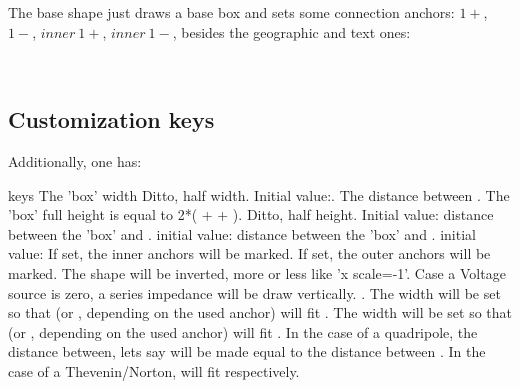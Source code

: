 \documentclass[a4paper, titlepage]{article}
\begin{document}
The base shape just draws a base box and sets some connection anchors: $1+$, $1-$, $inner\ 1+$, $inner\ 1-$, besides the geographic and text ones:

        
~   

\subsection{Customization keys}\label{BBkeys}

Additionally, one has:

\begin{describelist*}[30mm]{keys}
    {The 'box' width}
    {Ditto, half width. Initial value:.}
    {The distance between . The 'box' full height is equal to 2*( +  + ).}
   {Ditto, half height. Initial value: }
   {distance between the 'box' and . initial value: }
   {distance between the 'box' and . initial value: }
    {If set, the inner anchors will be marked.}
    {If set, the outer anchors will be marked.}
   {The shape will be inverted, more or less like 'x scale=-1'.}
   {Case a Voltage source is zero, a series impedance will be draw vertically.}
   {. The width will be set so that  (or , depending on the used anchor) will fit }
   {. The width will be set so that  (or , depending on the used anchor) will fit }
   {. In the case of a quadripole, the distance between, lets say  will be made equal to the distance between . In the case of a Thevenin/Norton,  will fit  respectively.}
\end{describelist*}
\end{document}
